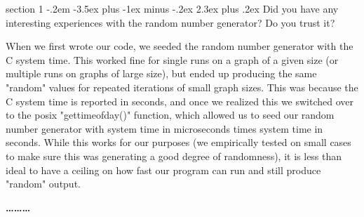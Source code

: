 \documentclass[12pt]{article}
\makeatletter
\newenvironment{problem}{\@startsection
       {section}
       {1}
       {-.2em}
       {-3.5ex plus -1ex minus -.2ex}
       {2.3ex plus .2ex}
       {\pagebreak[3]%
       \large\bf\noindent{Problem }
       }
       }
       {%
       \begin{center}\large\bf \ldots\ldots\ldots\end{center}}
\makeatother
\begin{document}
\begin{problem}{}
Did you have any interesting experiences with the random number
generator? Do you trust it?

When we first wrote our code, we seeded the random number generator with the C system time.  This worked fine for single runs on a graph of a given size (or multiple runs on graphs of large size), but ended up producing the same "random" values for repeated iterations of small graph sizes.  This was because the C system time is reported in seconds, and once we realized this we switched over to the posix "gettimeofday()" function, which allowed us to seed our random number generator with system time in microseconds times system time in seconds.  While this works for our purposes (we empirically tested on small cases to make sure this was generating a good degree of randomness), it is less than ideal to have a ceiling on how fast our program can run and still produce "random" output.  

\end{problem}

\end{document}
